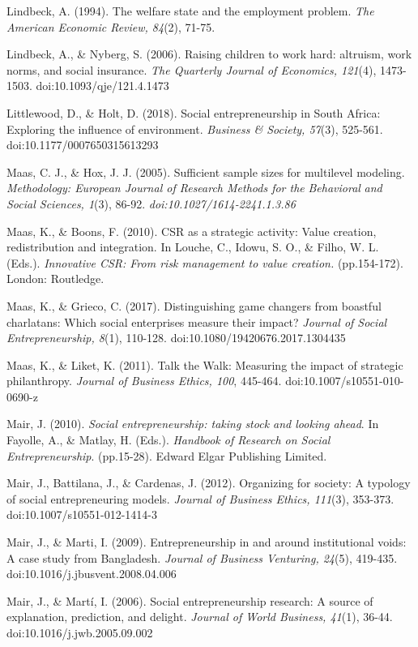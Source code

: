\documentclass{article}
\begin{document}
Lindbeck, A. (1994). The welfare state and the employment problem. \emph{The American Economic Review, 84}(2), 71-75. 

Lindbeck, A., \& Nyberg, S. (2006). Raising children to work hard: altruism, work norms, and social insurance. \emph{The Quarterly Journal of Economics, 121}(4), 1473-1503. doi:10.1093/qje/121.4.1473

Littlewood, D., \& Holt, D. (2018). Social entrepreneurship in South Africa: Exploring the influence of environment. \emph{Business \& Society, 57}(3), 525-561. doi:10.1177/0007650315613293

Maas, C. J., \& Hox, J. J. (2005). Sufficient sample sizes for multilevel modeling. \emph{Methodology: European Journal of Research Methods for the }\emph{Behavioral}\emph{ and Social Sciences, 1}(3), 86-92. \emph{doi:10.1027/1614-2241.1.3.86}

Maas, K., \& Boons, F. (2010). CSR as a strategic activity: Value creation, redistribution and integration. In Louche, C., Idowu, S. O., \& Filho, W. L. (Eds.). \emph{Innovative CSR: From risk management to value creation. }(pp.154-172). London: Routledge. 

Maas, K., \& Grieco, C. (2017). Distinguishing game changers from boastful charlatans: Which social enterprises measure their impact? \emph{Journal of Social Entrepreneurship, 8}(1), 110-128. doi:10.1080/19420676.2017.1304435

Maas, K., \& Liket, K. (2011). Talk the Walk: Measuring the impact of strategic philanthropy. \emph{Journal of Business Ethics, 100}, 445-464. doi:10.1007/s10551-010-0690-z

Mair, J. (2010). \emph{Social entrepreneurship: taking stock and looking ahead}. In Fayolle, A., \& Matlay, H. (Eds.). \emph{Handbook of Research on Social Entrepreneurship}. (pp.15-28). Edward Elgar Publishing Limited.

Mair, J., Battilana, J., \& Cardenas, J. (2012). Organizing for society: A typology of social entrepreneuring models. \emph{Journal of Business Ethics, 111}(3), 353-373. doi:10.1007/s10551-012-1414-3

Mair, J., \& Marti, I. (2009). Entrepreneurship in and around institutional voids: A case study from Bangladesh. \emph{Journal of Business Venturing, 24}(5), 419-435. doi:10.1016/j.jbusvent.2008.04.006

Mair, J., \& Martí, I. (2006). Social entrepreneurship research: A source of explanation, prediction, and delight. \emph{Journal of World Business, 41}(1), 36-44. doi:10.1016/j.jwb.2005.09.002
\end{document}

